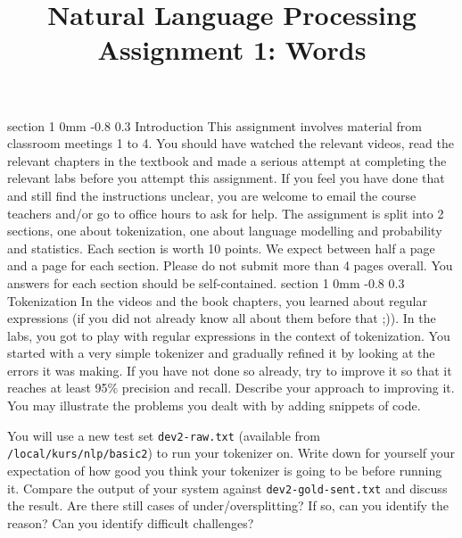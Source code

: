 \documentclass[11pt]{article}
\title{{\LARGE Natural Language Processing}\\[1.5mm]{\large Assignment 1: Words}}
\author{}
\date{} %
\makeatletter
\renewcommand{\section}{\@startsection
{section}%
{1}%
{0mm}%
{-0.8\baselineskip}%
{0.3\baselineskip}%
{\bfseries\large}}%
\makeatother
\begin{document}


\maketitle
\thispagestyle{empty}
\section{Introduction}
\indent This assignment involves material from classroom meetings 1 to
4. You should have watched the relevant videos, read the relevant
chapters in the textbook and made a serious attempt at completing the
relevant labs before you attempt this assignment. If you feel you have
done that and still find the instructions unclear, you are welcome to
email the course teachers and/or go to office hours to ask for
help.  The assignment is split into 2 sections, one about
tokenization, one about language modelling and probability and
statistics. Each section is worth 10 points. We expect between half a
page and a page for each section. Please do not submit more than 4
pages overall.  You answers %
for each section should be self-contained.
\section{Tokenization}
In the videos and the book chapters, you learned about regular
expressions (if you did not already know all about them before that
;)). In the labs, you got to play with regular expressions in the
context of tokenization.  You started with a very simple tokenizer and
gradually refined it by looking at the errors it was making.  If you
have not done so already, try to improve it so that it reaches at
least 95\% precision and recall.  Describe your approach to improving
it. You may illustrate the problems you dealt with by adding snippets
of code.

You will use a new test set {\tt dev2-raw.txt} (available from {\tt
  /local/kurs/nlp/basic2}) to run your tokenizer on. Write down for
yourself your expectation of how good you think your tokenizer is
going to be before running it.  Compare the output of your system
against {\tt dev2-gold-sent.txt} and discuss the result. Are there
still cases of under/oversplitting? If so, can you identify the
reason? Can you identify difficult challenges?
\end{document}
